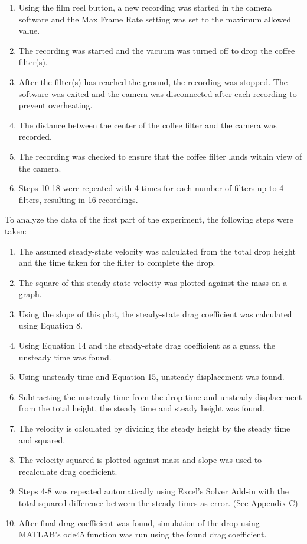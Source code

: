 \documentclass[12pt]{report}
\begin{document}
\begin{enumerate}
	\item Using the film reel button, a new recording was started in the camera software and the Max Frame Rate setting was set to the maximum allowed value.
	\item The recording was started and the vacuum was turned off to drop the coffee filter(s).
	\item After the filter(s) has reached the ground, the recording was stopped. The software was exited and the camera was disconnected after each recording to prevent overheating.
	\item The distance between the center of the coffee filter and the camera was recorded.
	\item The recording was checked to ensure that the coffee filter lands within view of the camera. 
	\item Steps 10-18 were repeated with 4 times for each number of filters up to 4 filters, resulting in 16 recordings.
\end{enumerate}

\noindent To analyze the data of the first part of the experiment, the following steps were taken:

\begin{enumerate}
	\item The assumed steady-state velocity was calculated from the total drop height and the time taken for the filter to complete the drop.
	\item The square of this steady-state velocity was plotted against the mass on a graph.
	\item Using the slope of this plot, the steady-state drag coefficient was calculated using Equation 8.
	\item Using Equation 14 and the steady-state drag coefficient as a guess, the unsteady time was found. 
	\item Using unsteady time and Equation 15, unsteady displacement was found.
	\item Subtracting the unsteady time from the drop time and unsteady displacement from the total height, the steady time and steady height was found.
	\item The velocity is calculated by dividing the steady height by the steady time and squared.
	\item The velocity squared is plotted against mass and slope was used to recalculate drag coefficient.
	\item Steps 4-8 was repeated automatically using Excel's Solver Add-in with the total squared difference between the steady times as error. (See Appendix C)
	\item After final drag coefficient was found, simulation of the drop using MATLAB's ode45 function was run using the found drag coefficient.
\end{enumerate}
\end{document}
